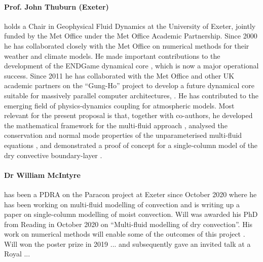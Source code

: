 \documentclass[11pt,a4paper]{article}
\begin{document}
\paragraph*{Prof. John Thuburn (Exeter)} holds a Chair in Geophysical Fluid Dynamics at the University of Exeter, jointly
funded by the Met Office under the Met Office Academic Partnership.
Since 2000 he has collaborated closely with the Met Office on numerical methods for their
weather and climate models. He made important contributions to the development of the
ENDGame dynamical core \cite[e.g.][]{WSW+14}, which is now a major operational success.
Since 2011 he has collaborated with the Met Office and other UK academic partners on the ``Gung-Ho''
project to develop a future dynamical core suitable for massively parallel computer
architectures, \citep[e.g.][]{MBS+19}.
He has contributed to the emerging field of physics-dynamics coupling for atmospheric models.
Most relevant for the present proposal is that,
together with co-authors, he developed the mathematical framework for the multi-fluid
approach \citep[][]{TWV+18}, analysed the conservation and normal mode properties
of the unparameterised multi-fluid equations \citep[][]{TV18}, and demonstrated
a proof of concept for a single-column model of the dry convective boundary-layer \citep[][]{TEB19}.

\paragraph*{Dr William McIntyre} has been a PDRA on the Paracon project at Exeter since October 2020 where he has been working on multi-fluid modelling of convection and is writing up a paper on single-column modelling of moist convection. Will was awarded his PhD from Reading in October 2020 on ``Multi-fluid modelling of dry convection''. His work on numerical methods will enable some of the outcomes of this project \cite{MWH20}. Will won the poster prize in 2019 ... and subsequently gave an invited talk at a Royal ...
\end{document}
